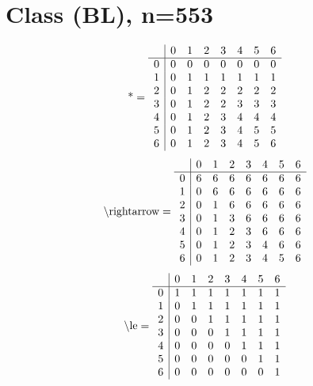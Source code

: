 \documentclass[11pt]{article}
\begin{document}
\section{Class (BL), n=553}
\[\text{*} = 
\begin{array}{r | r r r r r r r}
 & 0 & 1 & 2 & 3 & 4 & 5 & 6 \\ \hline
0 & 0 & 0 & 0 & 0 & 0 & 0 & 0 \\
1 & 0 & 1 & 1 & 1 & 1 & 1 & 1 \\
2 & 0 & 1 & 2 & 2 & 2 & 2 & 2 \\
3 & 0 & 1 & 2 & 2 & 3 & 3 & 3 \\
4 & 0 & 1 & 2 & 3 & 4 & 4 & 4 \\
5 & 0 & 1 & 2 & 3 & 4 & 5 & 5 \\
6 & 0 & 1 & 2 & 3 & 4 & 5 & 6 \\
\end{array}
\]
\[\text{\textbackslash rightarrow} = 
\begin{array}{r | r r r r r r r}
 & 0 & 1 & 2 & 3 & 4 & 5 & 6 \\ \hline
0 & 6 & 6 & 6 & 6 & 6 & 6 & 6 \\
1 & 0 & 6 & 6 & 6 & 6 & 6 & 6 \\
2 & 0 & 1 & 6 & 6 & 6 & 6 & 6 \\
3 & 0 & 1 & 3 & 6 & 6 & 6 & 6 \\
4 & 0 & 1 & 2 & 3 & 6 & 6 & 6 \\
5 & 0 & 1 & 2 & 3 & 4 & 6 & 6 \\
6 & 0 & 1 & 2 & 3 & 4 & 5 & 6 \\
\end{array}
\]
\[\text{\textbackslash le} = 
\begin{array}{r | r r r r r r r}
 & 0 & 1 & 2 & 3 & 4 & 5 & 6 \\ \hline
0 & 1 & 1 & 1 & 1 & 1 & 1 & 1 \\
1 & 0 & 1 & 1 & 1 & 1 & 1 & 1 \\
2 & 0 & 0 & 1 & 1 & 1 & 1 & 1 \\
3 & 0 & 0 & 0 & 1 & 1 & 1 & 1 \\
4 & 0 & 0 & 0 & 0 & 1 & 1 & 1 \\
5 & 0 & 0 & 0 & 0 & 0 & 1 & 1 \\
6 & 0 & 0 & 0 & 0 & 0 & 0 & 1 \\
\end{array}
\]
\end{document}
